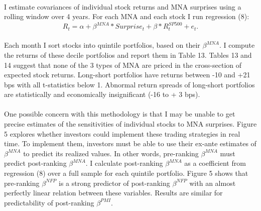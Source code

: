 \documentclass[12pt]{article}
\begin{document}
\paragraph{}
I estimate covariances of individual stock returns and MNA surprises using a rolling window over 4 years. For each MNA and each stock I run regression (8):
\begin{equation}
   R_t = \alpha + \beta^{MNA} * Surprise_t + \beta*R^{SP500}_t + e_t.
\end{equation}
\paragraph{}
Each month I sort stocks into quintile portfolios, based on their $\beta^{MNA}$. I compute the returns of these decile portfolios and report them in Table 13. Tables 13 and 14 suggest that none of the 3 types of MNA are priced in the cross-section of expected stock returns. Long-short portfolios have returns between -10 and +21 bps with all t-statistics below 1. Abnormal return spreads of long-short portfolios are statistically and economically insignificant (-16 to + 3 bps).
\paragraph{}
One possible concern with this methodology is that I may be unable to get precise estimates of the sensitivities of individual stocks to MNA surprises. Figure 5 explores whether investors could implement these trading strategies in real time. To implement them, investors must be able to use their ex-ante estimates of $\beta^{MNA}$ to predict its realized values. In other words, pre-ranking $\beta^{MNA}$ must predict post-ranking $\beta^{MNA}$. I calculate post-ranking $\beta^{MNA}$ as a coefficient from regression (8) over a full sample for each quintile portfolio. Figure 5 shows that pre-ranking $\beta^{NFP}$ is a strong predictor of post-ranking $\beta^{NFP}$ with an almost perfectly linear relation between these variables. Results are similar for predictability of post-ranking $\beta^{PMI}$.
\end{document}
